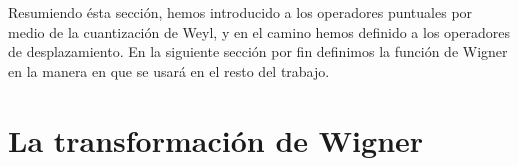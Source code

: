 \documentclass[a4paper]{report}
\DeclareMathOperator{\Op}{Op}
\begin{document}
  Resumiendo ésta sección, hemos introducido a los
  operadores puntuales por medio de la cuantización de Weyl,
  y en el camino hemos definido a los operadores de
  desplazamiento.  En la siguiente sección por fin definimos
  la función de Wigner en la manera en que se usará en el
  resto del trabajo.


  \section{La transformación de Wigner}
\end{document}
